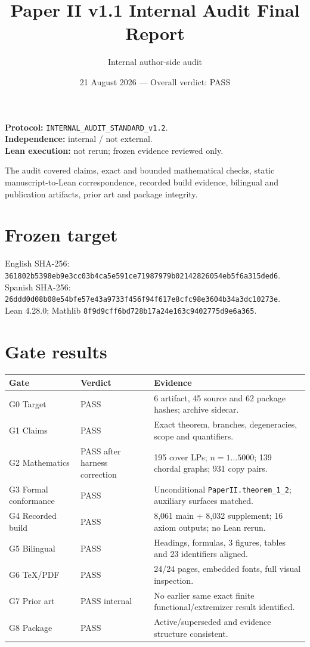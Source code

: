\documentclass[11pt]{article}
\title{Paper II v1.1 Internal Audit Final Report}
\author{Internal author-side audit}
\date{21 August 2026 --- Overall verdict: PASS}
\begin{document}
\maketitle
\textbf{Protocol:} \texttt{INTERNAL\_AUDIT\_STANDARD\_v1.2}.\\
\textbf{Independence:} internal / not external.\\
\textbf{Lean execution:} not rerun; frozen evidence reviewed only.

The audit covered claims, exact and bounded mathematical checks, static
manuscript-to-Lean correspondence, recorded build evidence, bilingual and
publication artifacts, prior art and package integrity.

\section{Frozen target}
English SHA-256: \texttt{361802b5398eb9e3cc03b4ca5e591ce7}\linebreak\texttt{1987979b02142826054eb5f6a315ded6}.\\
Spanish SHA-256: \texttt{26ddd0d08b08e54bfe57e43a9733f456}\linebreak\texttt{f94f617e8cfc98e3604b34a3dc10273e}.\\
Lean 4.28.0; Mathlib \texttt{8f9d9cff6bd728b17a24e163c9402775d9e6a365}.

\section{Gate results}
\begin{longtable}{p{.18\linewidth}p{.20\linewidth}p{.52\linewidth}}
\toprule Gate & Verdict & Evidence \\ \midrule
G0 Target & PASS & 6 artifact, 45 source and 62 package hashes; archive sidecar. \\
G1 Claims & PASS & Exact theorem, branches, degeneracies, scope and quantifiers. \\
G2 Mathematics & PASS after harness correction & 195 cover LPs; $n=1\ldots5000$; 139 chordal graphs; 931 copy pairs. \\
G3 Formal conformance & PASS & Unconditional \texttt{PaperII.theorem\_1\_2}; auxiliary surfaces matched. \\
G4 Recorded build & PASS & 8,061 main + 8,032 supplement; 16 axiom outputs; no Lean rerun. \\
G5 Bilingual & PASS & Headings, formulas, 3 figures, tables and 23 identifiers aligned. \\
G6 TeX/PDF & PASS & 24/24 pages, embedded fonts, full visual inspection. \\
G7 Prior art & PASS internal & No earlier same exact finite functional/extremizer result identified. \\
G8 Package & PASS & Active/superseded and evidence structure consistent. \\
\bottomrule\end{longtable}
\end{document}
